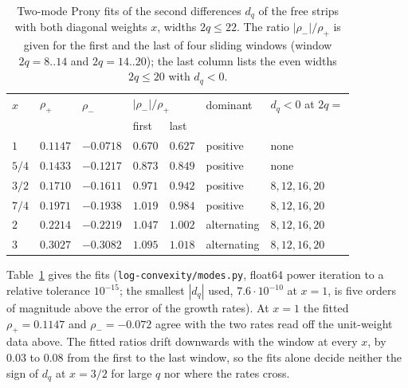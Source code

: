 \documentclass[11pt]{amsart}
\theoremstyle{definition}
\theoremstyle{remark}
\begin{document}
\begin{table}[ht]
\centering
\caption{Two-mode Prony fits of the second differences $d_q$ of the free strips with both diagonal
weights $x$, widths $2q \le 22$. The ratio $|\rho_-|/\rho_+$ is given for the first and the last of
four sliding windows (window $2q = 8..14$ and $2q = 14..20$); the last column lists the even widths
$2q \le 20$ with $d_q < 0$.}\label{tab:modes}
\begin{tabular}{lllllll}
\toprule
$x$ & $\rho_+$ & $\rho_-$ & \multicolumn{2}{l}{$|\rho_-|/\rho_+$} & dominant & $d_q < 0$ at $2q =$\\
 & & & first & last & & \\
\midrule
$1$     & $0.1147$ & $-0.0718$ & $0.670$ & $0.627$ & positive & none\\
$5/4$   & $0.1433$ & $-0.1217$ & $0.873$ & $0.849$ & positive & none\\
$3/2$   & $0.1710$ & $-0.1611$ & $0.971$ & $0.942$ & positive & $8, 12, 16, 20$\\
$7/4$   & $0.1971$ & $-0.1938$ & $1.019$ & $0.984$ & positive & $8, 12, 16, 20$\\
$2$     & $0.2214$ & $-0.2219$ & $1.047$ & $1.002$ & alternating & $8, 12, 16, 20$\\
$3$     & $0.3027$ & $-0.3082$ & $1.095$ & $1.018$ & alternating & $8, 12, 16, 20$\\
\bottomrule
\end{tabular}
\end{table}

Table~\ref{tab:modes} gives the fits (\texttt{log-convexity/modes.py}, float64 power iteration to a relative
tolerance $10^{-15}$; the smallest $|d_q|$ used, $7.6\cdot10^{-10}$ at $x = 1$, is five orders of
magnitude above the error of the growth rates). At $x = 1$ the fitted $\rho_+ = 0.1147$ and
$\rho_- = -0.072$ agree with the two rates read off the unit-weight data above. The fitted ratios
drift downwards with the window at every $x$, by $0.03$ to $0.08$ from the first to the last window,
so the fits alone decide neither the sign of $d_q$ at $x = 3/2$ for large $q$ nor where the rates cross.
\end{document}
